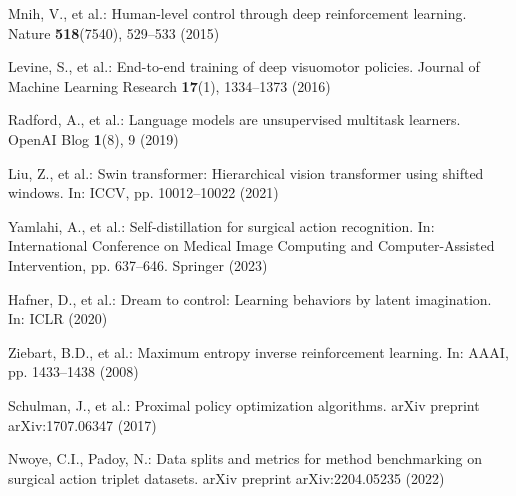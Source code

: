\documentclass[runningheads]{llncs}
\begin{document}
\begin{thebibliography}{22}
Mnih, V., et al.: Human-level control through deep reinforcement learning. Nature \textbf{518}(7540), 529--533 (2015)

Levine, S., et al.: End-to-end training of deep visuomotor policies. Journal of Machine Learning Research \textbf{17}(1), 1334--1373 (2016)

Radford, A., et al.: Language models are unsupervised multitask learners. OpenAI Blog \textbf{1}(8), 9 (2019)

Liu, Z., et al.: Swin transformer: Hierarchical vision transformer using shifted windows. In: ICCV, pp. 10012--10022 (2021)

Yamlahi, A., et al.: Self-distillation for surgical action recognition. In: International Conference on Medical Image Computing and Computer-Assisted Intervention, pp. 637--646. Springer (2023)

Hafner, D., et al.: Dream to control: Learning behaviors by latent imagination. In: ICLR (2020)

Ziebart, B.D., et al.: Maximum entropy inverse reinforcement learning. In: AAAI, pp. 1433--1438 (2008)

Schulman, J., et al.: Proximal policy optimization algorithms. arXiv preprint arXiv:1707.06347 (2017)

Nwoye, C.I., Padoy, N.: Data splits and metrics for method benchmarking on surgical action triplet datasets. arXiv preprint arXiv:2204.05235 (2022)
\end{thebibliography}
\end{document}
